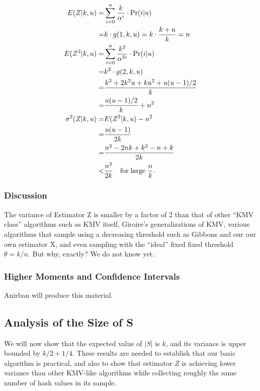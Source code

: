 \documentclass{sig-alternate}
\begin{document}
\begin{align}
 E(Z|k,u)  = & \sum_{i=0}^{u}\frac{k}{\alpha^i} \cdot \mathrm{Pr}(i|u) \\
  = & k \cdot g(1,k,u) = k\cdot\frac{k+u}{k} = n \\
\vspace{0.75em}
 E(Z^2|k,u) = & \sum_{i=0}^{u}\frac{k^2}{\alpha^{2i}} \cdot \mathrm{Pr}(i|u) \\
  = & k^2 \cdot g(2,k,u) \\
  = & \frac{k^3 + 2k^2u + ku^2 + u(u-1)/2}{k} \\
  = & \frac{u(u-1)/2}{k} + n^2 \\
\vspace{0.75em}
 \sigma^2(Z|k,u) = & E(Z^2|k,u) - n^2 \\
                 = & \frac{u(u-1)}{2k} \\
                 = & \frac{n^2-2nk+k^2-n+k}{2k} \\
                 < & \frac{n^2}{2k}\quad \mathrm{for\;large} \; \frac{n}{k}.
\end{align}

\subsubsection{Discussion}

The variance of Estimator Z is smaller by a factor of 2 than that of other ``KMV class'' 
algorithms such as KMV itself, Giroire's generalizations of KMV,
various algorithms that sample using a decreasing threshold such as Gibbons and
our our own estimator X, and even sampling with the ``ideal'' fixed
fixed threshold $\theta = k / n$. But why, exactly? We do not know yet.

\subsubsection{Higher Moments and Confidence Intervals}

Anirban will produce this material.

\subsection{Analysis of the Size of S}

We will now show that the expected value of $|S|$ is $k$, and its variance
is upper bounded by $k/2 + 1/4$. These results are needed to establish that our
basic algorithm is practical, and also to show that estimator $Z$ is achieving
lower variance than other KMV-like algorithms while collecting roughly the same
number of hash values in its sample.
\end{document}
